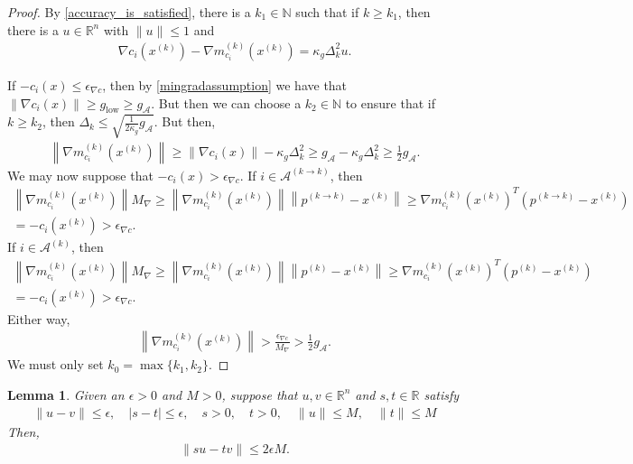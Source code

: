 \documentclass{article}
\newtheorem{lemma}[theorem]{Lemma}
\theoremstyle{case}
\numberwithin{theorem}{subsection}
\newcommand{\dk}{\Delta_k}
\newcommand{\gmcik}{{\nabla m_{c_i}^{(k)}\left(\xk\right)}}
\newcommand{\maxgrad}{{M_{\nabla}}}
\newcommand{\minactivegrad}{{ g_{\mathcal A} }}
\newcommand{\mingradepsilon}{{\epsilon_{\nabla c}}}
\newcommand{\mingrad}{{ g_{\textrm{low}} }}
\newcommand{\naturals}{\mathbb N}
\newcommand{\reals}{\mathbb R}
\newcommand{\Rn}{\mathbb R^n}
\newcommand{\xk}{x^{(k)}}
\begin{document}
\begin{proof}
By \cref{accuracy_is_satisfied}, there is a $k_1 \in \naturals $ such that if $k \ge k_1$, then there is a $u \in \Rn$ with $\|u\| \le 1$ and
\begin{align*}
\nabla c_i(\xk) - \gmcik = \kappa_g \dk^2 u.
\end{align*}

If $-c_i(x) \le \mingradepsilon$, then by \cref{mingradassumption} we have that $\|\nabla c_i(x)\| \ge \mingrad \ge \minactivegrad$.
But then we can choose a $k_2 \in \naturals$ to ensure that if $k \ge k_2$, then $\dk \le \sqrt{\frac 1 {2\kappa_g} \minactivegrad}$.
But then,
\begin{align*}
\left\|\gmcik\right\| \ge \|\nabla c_i(x)\| - \kappa_g \dk^2 \ge \minactivegrad - \kappa_g \dk^2 \ge \frac 1 2 \minactivegrad.
\end{align*}
We may now suppose that $-c_i(x) > \mingradepsilon$.
If $i \in \mathcal A^{(k\to k)}$, then
\begin{align*}
\left\|\gmcik\right\| \maxgrad \ge \left\|\gmcik\right\|\left\|p^{(k\to k)} - \xk\right\|
\ge \gmcik^T\left(p^{(k\to k)} - \xk\right) \\
= -c_i(\xk) > \mingradepsilon.
\end{align*}
If $i \in \mathcal A^{(k)}$, then
\begin{align*}
\left\|\gmcik\right\| \maxgrad \ge \left\|\gmcik\right\|\left\|p^{(k)} - \xk\right\|
\ge \gmcik^T\left(p^{(k)} - \xk\right) \\
= -c_i(\xk) > \mingradepsilon.
\end{align*}
Either way,
\begin{align*}
\left\|\gmcik\right\| > \frac {\mingradepsilon} {\maxgrad} > \frac 1 2 \minactivegrad.
\end{align*}
We must only set $k_0 = \max\{k_1, k_2\}$.
\end{proof}


\begin{lemma}
\label{the_simple_bound_one}
Given an $\epsilon > 0$ and $M > 0$, suppose that $u,v \in \Rn$ and $s,t \in \reals$ satisfy
\begin{align}
\|u - v \| \le \epsilon, \quad
|s - t | \le \epsilon, \quad
s > 0, \quad
t > 0, \quad
\|u\| \le M, \quad
\|t\| \le M
\end{align}
Then,
\begin{align}
\bigg\|su - tv\bigg\| \le 2\epsilon M.
\end{align}
\end{lemma}
\end{document}
